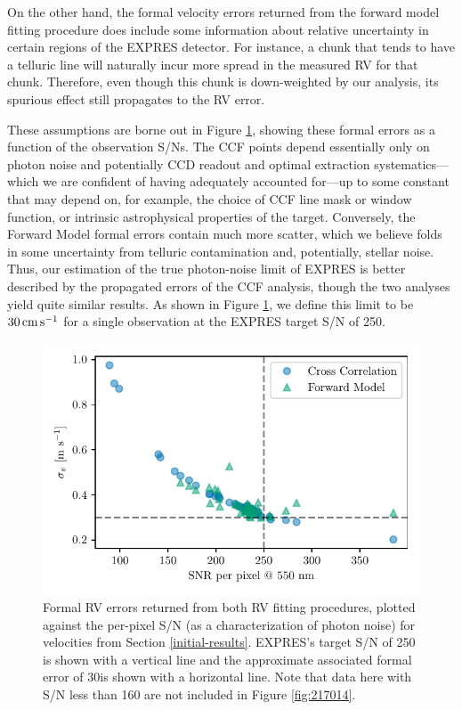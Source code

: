 On the other hand, the formal velocity errors returned from the forward model fitting procedure does include some information
about relative uncertainty in certain regions of the EXPRES detector. For instance, a chunk that tends to have a telluric line will naturally incur more spread in the measured RV for that chunk. Therefore, even though this chunk is down-weighted by our analysis, its spurious effect still propagates to the RV error.

These assumptions are borne out in Figure \ref{fig:snr}, showing these formal errors as a function of the observation S/Ns. The CCF points depend essentially only on photon noise and potentially CCD readout and optimal extraction systematics---which we are confident of having adequately accounted for---up to some constant that may depend on, for example, the choice of CCF line mask or window function, or intrinsic astrophysical properties of the target. Conversely, the Forward Model formal errors contain much more scatter, which we believe folds in some uncertainty from telluric contamination and, potentially, stellar noise. Thus, our estimation of the true photon-noise limit of EXPRES is better described by the propagated errors of the CCF analysis, though the two analyses yield quite similar results. As shown in Figure \ref{fig:snr}, we define this limit to be $30{{\,\mathrm{cm\,s^{-1}}}}$ for a single observation at the EXPRES target S/N of 250.

\begin{figure}
    \centering
    \includegraphics[width=\textwidth]{figures-4/err_vs_snr.pdf}
    \caption{Formal RV errors returned from both RV fitting procedures, plotted against the per-pixel S/N (as a characterization of photon noise) for velocities from Section \ref{initial-results}. EXPRES's target S/N of 250 is shown with a vertical line and the approximate associated formal error of 30\cms is shown with a horizontal line. Note that data here with S/N less than 160 are not included in Figure \ref{fig:217014}.}
    \label{fig:snr}
\end{figure}

